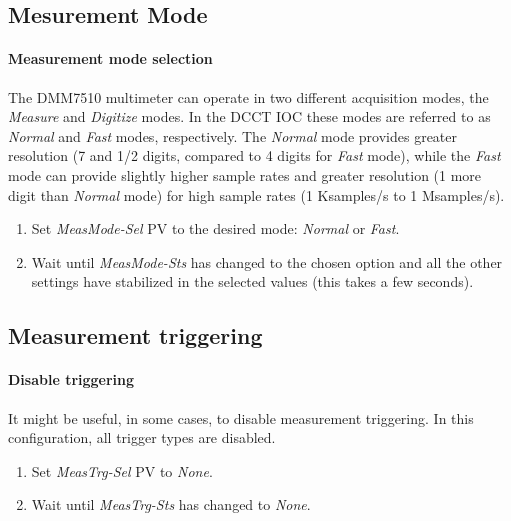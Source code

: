 \documentclass[openany]{article}
\begin{document}
	\subsection{Mesurement Mode}\label{measurement-mode}

		\paragraph{Measurement mode selection}\label{measurement-mode-selection} The DMM7510 multimeter can operate in two different acquisition modes, the \emph{Measure} and \emph{Digitize} modes. In the DCCT IOC these modes are referred to as \emph{Normal} and \emph{Fast} modes, respectively. The \emph{Normal} mode provides greater resolution (7 and 1/2 digits, compared to 4 digits for \emph{Fast} mode), while the \emph{Fast} mode can provide slightly higher sample rates and greater resolution (1 more digit than \emph{Normal} mode) for high sample rates (1 Ksamples/s to 1 Msamples/s).

	\bigskip
	\noindent{}

			\begin{enumerate}
				\item Set \emph{MeasMode-Sel} PV to the desired mode: \emph{Normal} or \emph{Fast}.
				\item Wait until \emph{MeasMode-Sts} has changed to the chosen option and all the other settings have stabilized in the selected values (this takes a few seconds).
			\end{enumerate}

	\subsection{Measurement triggering}

		\paragraph{Disable triggering}\label{disable-triggering} It might be useful, in some cases, to disable measurement triggering. In this configuration, all trigger types are disabled.

			\begin{enumerate}
				\item Set \emph{MeasTrg-Sel} PV to \emph{None}.
				\item Wait until \emph{MeasTrg-Sts} has changed to \emph{None}.
			\end{enumerate}
\end{document}
